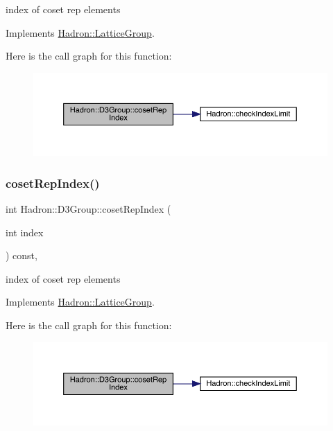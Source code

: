 index of coset rep elements 

Implements \mbox{\hyperlink{structHadron_1_1LatticeGroup_a7e3b9b5e2f596e6c40d64aa939a3ad6c}{Hadron\+::\+Lattice\+Group}}.

Here is the call graph for this function\+:
\nopagebreak
\begin{figure}[H]
\begin{center}
\leavevmode
\includegraphics[width=350pt]{de/de1/structHadron_1_1D3Group_a361cfe22330be972fe6d49bc2e1af871_cgraph}
\end{center}
\end{figure}
\mbox{\label{structHadron_1_1D3Group_a361cfe22330be972fe6d49bc2e1af871}} 
\subsubsection{\texorpdfstring{cosetRepIndex()}{cosetRepIndex()}\hspace{0.1cm}{\footnotesize\ttfamily [3/3]}}
{\footnotesize\ttfamily int Hadron\+::\+D3\+Group\+::coset\+Rep\+Index (\begin{DoxyParamCaption}\item[{int}]{index }\end{DoxyParamCaption}) const\hspace{0.3cm}{\ttfamily [inline]}, {\ttfamily [virtual]}}

index of coset rep elements 

Implements \mbox{\hyperlink{structHadron_1_1LatticeGroup_a7e3b9b5e2f596e6c40d64aa939a3ad6c}{Hadron\+::\+Lattice\+Group}}.

Here is the call graph for this function\+:
\nopagebreak
\begin{figure}[H]
\begin{center}
\leavevmode
\includegraphics[width=350pt]{de/de1/structHadron_1_1D3Group_a361cfe22330be972fe6d49bc2e1af871_cgraph}
\end{center}
\end{figure}
\mbox{\label{structHadron_1_1D3Group_a90114a92f0c05cdfd8ff56e33606d3c3}} 
